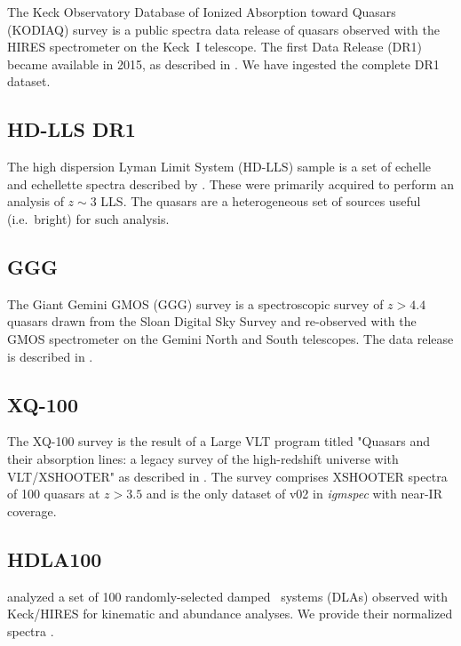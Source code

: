 \documentclass[12pt]{elsarticle}
\begin{document}
The Keck Observatory Database of Ionized Absorption toward Quasars (KODIAQ) survey is a public spectra data release of quasars observed with the HIRES spectrometer 
\citep{vogt94} on the Keck~I telescope. 
The first Data Release (DR1) became available in 2015, 
as described in \cite{kodiaq_dr1}. 
We have ingested the complete DR1 dataset.

\subsection{HD-LLS DR1}
\label{sec:hdlls}

The high dispersion Lyman Limit System (HD-LLS) sample is a set of echelle and echellette spectra described by \cite{prochaska+15}.  
These were primarily acquired
to perform an analysis of $z \sim 3$ LLS. 
The quasars are a heterogeneous set of sources useful 
(i.e.\ bright) for such analysis. 

\subsection{GGG}
\label{sec:ggg}

The Giant Gemini GMOS (GGG) survey is a spectroscopic survey of 
$z>4.4$ quasars drawn from the Sloan Digital Sky Survey and re-observed with the GMOS spectrometer on the Gemini North and South telescopes. 
The data release is described in \cite{worseck+14}.

\subsection{XQ-100}
\label{sec:xq100}

The XQ-100 survey is the result of a Large VLT program
titled "Quasars and their absorption lines: 
a legacy survey of the high-redshift universe with VLT/XSHOOTER" 
as described in \cite{xq100}.
The survey comprises XSHOOTER spectra of 100 quasars 
at $z>3.5$ and is the only dataset of v02 in {\it igmspec}
with near-IR coverage.

\subsection{HDLA100}
\label{sec:hdla100}

\cite{marcel13} analyzed a set of 100 randomly-selected
damped \lya\ systems
(DLAs) observed with Keck/HIRES for kinematic and abundance
analyses.  We provide their normalized spectra
\citep[see also][]{pwh+07}.
\end{document}
